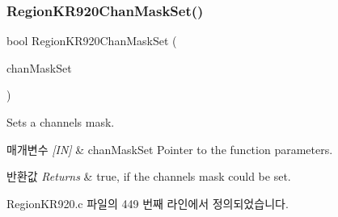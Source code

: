\subsubsection{\texorpdfstring{Region\+K\+R920\+Chan\+Mask\+Set()}{RegionKR920ChanMaskSet()}}
{\footnotesize\ttfamily bool Region\+K\+R920\+Chan\+Mask\+Set (\begin{DoxyParamCaption}\item[{\mbox{\hyperlink{group___r_e_g_i_o_n_ga6d24f7da136006410827dfb29f6b9b9e}{Chan\+Mask\+Set\+Params\+\_\+t}} $\ast$}]{chan\+Mask\+Set }\end{DoxyParamCaption})}



Sets a channels mask. 


\begin{DoxyParams}{매개변수}
{\em \mbox{[}\+I\+N\mbox{]}} & chan\+Mask\+Set Pointer to the function parameters.\\
\hline
\end{DoxyParams}

\begin{DoxyRetVals}{반환값}
{\em Returns} & true, if the channels mask could be set. \\
\hline
\end{DoxyRetVals}


Region\+K\+R920.\+c 파일의 449 번째 라인에서 정의되었습니다.


